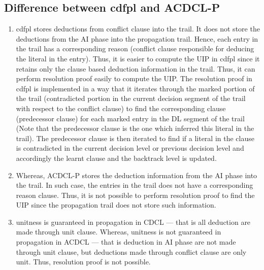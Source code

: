 \documentclass[a4paper,conference]{llncs}
\begin{document}
\subsection{Difference between cdfpl and ACDCL-P}
\begin{enumerate}
\item cdfpl stores deductions from conflict clause into the trail. It does not 
store the deductions from the AI phase into the propagation trail. Hence, each 
entry in the trail has a corresponding reason (conflict clause responsible for 
deducing the literal in the entry). Thus, it is easier to compute the UIP in
cdfpl since it retains only the clause based deduction information in the trail. 
Thus, it can perform resolution proof easily to compute the UIP. The resolution 
proof in cdfpl is implemented in a way that it iterates through the marked
portion of the trail (contradicted portion in the current decision segment of
the trail with respect to the conflict clause) to find the corresponding clause 
(predecessor clause) for each marked entry in the DL segment of the trail 
(Note that the predecessor clause is the one which inferred this literal in the 
trail). The predecessor clause is then iterated to find if a literal in the 
clause is contradicted in the current decision level or previous decision level 
and accordingly the learnt clause and the backtrack level is updated. 
  
\item Whereas, ACDCL-P stores the deduction information from the AI phase into the 
trail. In such case, the entries in the trail does not have a corresponding
reason clause. Thus, it is not possible to perform resolution proof to find the 
UIP since the propagation trail does not store such information.   

\item unitness is guaranteed in propagation in CDCL — that is all deduction are 
made through unit clause. Whereas, unitness is not guaranteed in propagation in 
ACDCL — that is deduction in AI phase are not made through unit clause, but deductions
made through conflict clause are only unit. Thus, resolution proof is not possible.  

\end{enumerate}
\end{document}
